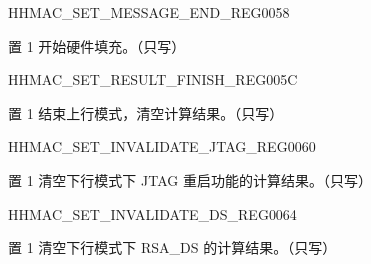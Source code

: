\begin{register}{H}{HMAC\_SET\_MESSAGE\_END\_REG}{\hexprefix{}0058}\label{regdesc:HMACSETMESSAGEENDREG}
%
%
\regnewline%
\begin{regdesc}\begin{reglist}
\label{fielddesc:HMACSETTEXTEND}\item [HMAC\_SET\_TEXT\_END] 置 1 开始硬件填充。（只写）
\end{reglist}\end{regdesc}
\end{register}


\begin{register}{H}{HMAC\_SET\_RESULT\_FINISH\_REG}{\hexprefix{}005C}\label{regdesc:HMACSETRESULTFINISHREG}
%
%
\regnewline%
\begin{regdesc}\begin{reglist}
\label{fielddesc:HMACSETRESULTEND}\item [HMAC\_SET\_RESULT\_END] 置 1 结束上行模式，清空计算结果。（只写）
\end{reglist}\end{regdesc}
\end{register}


\begin{register}{H}{HMAC\_SET\_INVALIDATE\_JTAG\_REG}{\hexprefix{}0060}\label{regdesc:HMACSETINVALIDATEJTAGREG}
%
%
\regnewline%
\begin{regdesc}\begin{reglist}
\label{fielddesc:HMACSETINVALIDATEJTAG}\item [HMAC\_SET\_INVALIDATE\_JTAG] 置 1 清空下行模式下 JTAG 重启功能的计算结果。（只写）
\end{reglist}\end{regdesc}
\end{register}


\begin{register}{H}{HMAC\_SET\_INVALIDATE\_DS\_REG}{\hexprefix{}0064}\label{regdesc:HMACSETINVALIDATEDSREG}
%
%
\regnewline%
\begin{regdesc}\begin{reglist}
\label{fielddesc:HMACSETINVALIDATEDS}\item [HMAC\_SET\_INVALIDATE\_DS] 置 1 清空下行模式下 RSA\_DS 的计算结果。（只写）
\end{reglist}\end{regdesc}
\end{register}


